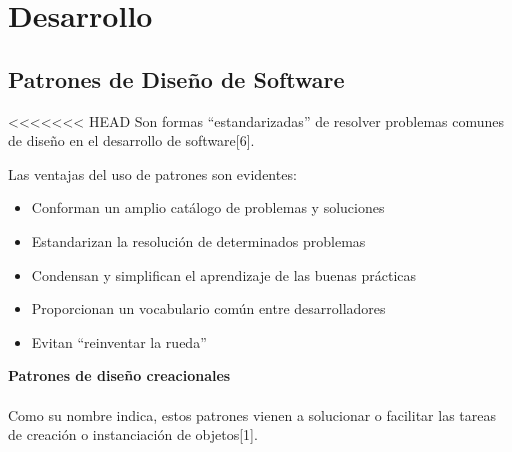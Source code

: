 \documentclass[twoside,twocolumn]{article}
\begin{document}
\section{Desarrollo}
\subsection{ Patrones de Diseño de Software}
<<<<<<< HEAD
Son formas “estandarizadas” de resolver problemas comunes de diseño en el desarrollo de software[6]. 

Las ventajas del uso de patrones son evidentes: 

\begin{itemize}
	\item Conforman un amplio catálogo de problemas y soluciones   
	\item Estandarizan la resolución de determinados problemas  
	\item Condensan y simplifican el aprendizaje de las buenas prácticas 
	\item Proporcionan un vocabulario común entre desarrolladores 
	\item Evitan “reinventar la rueda” 
\end{itemize}


    \item \textbf{Patrones de diseño creacionales} \\ \\
    Como su nombre indica, estos patrones vienen a solucionar o facilitar las tareas de creación o instanciación de objetos[1]. 
\end{document}
